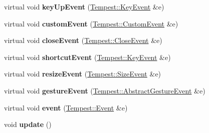 \begin{DoxyCompactItemize}
\item 
\hypertarget{class_tempest_1_1_widget_a7307299f0e2f9691f659e0ce0097edec}{virtual void {\bfseries key\+Up\+Event} (\hyperlink{class_tempest_1_1_key_event}{Tempest\+::\+Key\+Event} \&e)}\label{class_tempest_1_1_widget_a7307299f0e2f9691f659e0ce0097edec}

\item 
\hypertarget{class_tempest_1_1_widget_a7c72e03a68adf94ea889e7b4a848abf4}{virtual void {\bfseries custom\+Event} (\hyperlink{class_tempest_1_1_custom_event}{Tempest\+::\+Custom\+Event} \&e)}\label{class_tempest_1_1_widget_a7c72e03a68adf94ea889e7b4a848abf4}

\item 
\hypertarget{class_tempest_1_1_widget_ab6bcfa593a768fba9a69a6e436f8de29}{virtual void {\bfseries close\+Event} (\hyperlink{class_tempest_1_1_close_event}{Tempest\+::\+Close\+Event} \&e)}\label{class_tempest_1_1_widget_ab6bcfa593a768fba9a69a6e436f8de29}

\item 
\hypertarget{class_tempest_1_1_widget_a9968fc4f51abbbe630e953860944c17a}{virtual void {\bfseries shortcut\+Event} (\hyperlink{class_tempest_1_1_key_event}{Tempest\+::\+Key\+Event} \&e)}\label{class_tempest_1_1_widget_a9968fc4f51abbbe630e953860944c17a}

\item 
\hypertarget{class_tempest_1_1_widget_abf49010c1a4ba8d2d7e0a008fb1b3fc2}{virtual void {\bfseries resize\+Event} (\hyperlink{class_tempest_1_1_size_event}{Tempest\+::\+Size\+Event} \&e)}\label{class_tempest_1_1_widget_abf49010c1a4ba8d2d7e0a008fb1b3fc2}

\item 
\hypertarget{class_tempest_1_1_widget_ad2705918caafc1a7bd79118b3101f473}{virtual void {\bfseries gesture\+Event} (\hyperlink{class_tempest_1_1_abstract_gesture_event}{Tempest\+::\+Abstract\+Gesture\+Event} \&e)}\label{class_tempest_1_1_widget_ad2705918caafc1a7bd79118b3101f473}

\item 
\hypertarget{class_tempest_1_1_widget_a03de7a0db86432ec2620d78604e45c5f}{virtual void {\bfseries event} (\hyperlink{class_tempest_1_1_event}{Tempest\+::\+Event} \&e)}\label{class_tempest_1_1_widget_a03de7a0db86432ec2620d78604e45c5f}

\item 
\hypertarget{class_tempest_1_1_widget_a38aacc92bda1a1e91052873a4a955487}{void {\bfseries update} ()}\label{class_tempest_1_1_widget_a38aacc92bda1a1e91052873a4a955487}


\end{DoxyCompactItemize}
